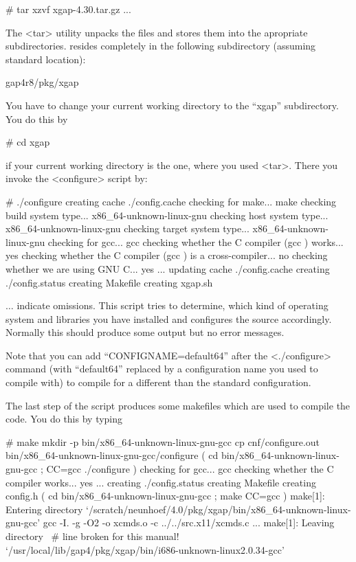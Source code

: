 \begintt
# tar xzvf xgap-4.30.tar.gz
...
\endtt

The <tar> utility unpacks the files and stores them into the apropriate
subdirectories. {\XGAP} resides completely in the following subdirectory
(assuming standard location):

\begintt
gap4r8/pkg/xgap
\endtt


You have to change your current working directory to the ``xgap''
subdirectory. You do this by

\begintt
# cd xgap
\endtt

if your current working directory is the one, where you used
<tar>. There you invoke the <configure> script by:

\begintt
# ./configure
creating cache ./config.cache
checking for make... make
checking build system type... x86_64-unknown-linux-gnu
checking host system type... x86_64-unknown-linux-gnu
checking target system type... x86_64-unknown-linux-gnu
checking for gcc... gcc
checking whether the C compiler (gcc  ) works... yes
checking whether the C compiler (gcc  ) is a cross-compiler... no
checking whether we are using GNU C... yes
...
updating cache ./config.cache
creating ./config.status
creating Makefile
creating xgap.sh
\endtt

$\ldots$ indicate omissions. 
This script tries to determine, which kind of operating system and
libraries you have installed and configures the source
accordingly. Normally this should produce some output but no error
messages. 

Note that you can add ``CONFIGNAME=default64'' after the <./configure>
command (with ``default64'' replaced by a configuration name you used
to compile {\GAP} with) to compile for a different than the standard
configuration.

The last step of the script produces some makefiles which are
used to compile the code. You do this by typing

\begintt
# make
mkdir -p bin/x86_64-unknown-linux-gnu-gcc
cp cnf/configure.out bin/x86_64-unknown-linux-gnu-gcc/configure
( cd bin/x86_64-unknown-linux-gnu-gcc ; CC=gcc ./configure  )
checking for gcc... gcc
checking whether the C compiler works... yes
...
creating ./config.status
creating Makefile
creating config.h
( cd bin/x86_64-unknown-linux-gnu-gcc ; make CC=gcc )
make[1]: Entering directory 
`/scratch/neunhoef/4.0/pkg/xgap/bin/x86_64-unknown-linux-gnu-gcc'
gcc -I. -g -O2   -o xcmds.o -c ../../src.x11/xcmds.c
...
make[1]: Leaving directory \                    # line broken for this manual!
     `/usr/local/lib/gap4/pkg/xgap/bin/i686-unknown-linux2.0.34-gcc'
\endtt

